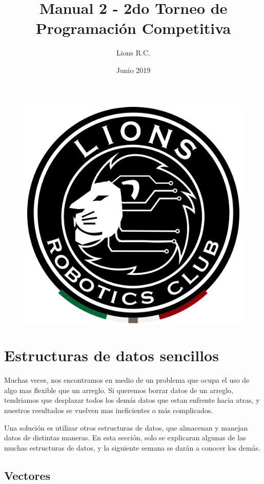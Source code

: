 \documentclass{article}
\title{Manual 2 - 2do Torneo de Programación Competitiva}
\author{Lions R.C.}
\date{Junio 2019}
\begin{document}
\maketitle

\tableofcontents

\begin{figure}[H]
    \centering
    \includegraphics[width=0.2\paperwidth]{newblack}
\end{figure}

\section{Estructuras de datos sencillos}

Muchas veces, nos encontramos en medio de un problema que ocupa el uso de algo mas flexible que un arreglo. Si queremos borrar datos de un arreglo, tendriamos que desplazar todos los demás datos que estan enfrente hacia atras, y nuestros resultados se vuelven mas ineficientes o más complicados.

Una solución es utilizar otros estructuras de datos, que almacenan y manejan datos de distintas maneras. En esta sección, solo se explicaran algunas de las muchas estructuras de datos, y la siguiente semana se darán a conocer los demás.

\subsection{Vectores}
\end{document}

